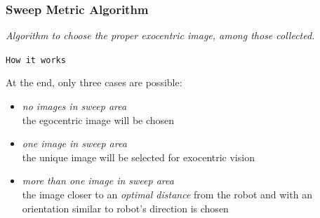 \frame
{
  \frametitle{Sweep Metric Algorithm}
  
  \emph{Algorithm to choose the proper \textit{exocentric} image,
    among those collected.}

  \begin{block} {\alert{\texttt{How it works}}}
 
    At the end, only three cases are possible:
    \pause
    \begin{itemize}
      
    \item \alert{\textit{no images in \textit{sweep area}}} \\
      the egocentric image will be chosen
      \pause
      
    \item \alert{\textit{one image in \textit{sweep area}}} \\
      the unique image will be selected for exocentric vision
      \pause
      
    \item \alert{\textit{more than one image in \textit{sweep area}}} \\
      the image closer to an \textit{optimal distance} from the robot
      and with an orientation similar to robot's direction is chosen

      
    \end{itemize}
    
  \end{block}
}




